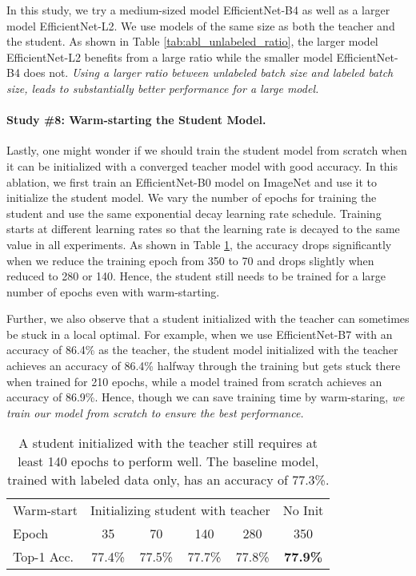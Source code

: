 \documentclass[10pt,twocolumn,letterpaper]{article}
\begin{document}
In this study, we try a medium-sized model EfficientNet-B4 as well as a larger model EfficientNet-L2. We use models of the same size as both the teacher and the student. As shown in Table \ref{tab:abl_unlabeled_ratio}, the larger model EfficientNet-L2 benefits from a large ratio while the smaller model EfficientNet-B4 does not. \emph{Using a larger ratio between unlabeled batch size and labeled batch size, leads to substantially better performance for a large model. }





\paragraph{Study \#8: Warm-starting the Student Model.}
Lastly, one might wonder if we should train the student model from scratch when it can be initialized with a converged teacher model with good accuracy. In this ablation, we first train an EfficientNet-B0 model on ImageNet and use it to initialize the student model. We vary the number of epochs for training the student and use the same exponential decay learning rate schedule. Training starts at different learning rates so that the learning rate is decayed to the same value in all experiments. As shown in Table \ref{tab:warm_start}, the accuracy drops significantly when we reduce the training epoch from 350 to 70 and drops slightly when reduced to 280 or 140. Hence, the student still needs to be trained for a large number of epochs even with warm-starting.

Further, we also observe that a student initialized with the teacher can sometimes be stuck in a local optimal. For example, when we use EfficientNet-B7 with an accuracy of 86.4\% as the teacher, the student model initialized with the teacher achieves an accuracy of 86.4\% halfway through the training but gets stuck there when trained for 210 epochs, while a model trained from scratch achieves an accuracy of 86.9\%. Hence, though we can save training time by warm-staring, \emph{we train our model from scratch to ensure the best performance.}

\begin{table}[h!]
\footnotesize
    \centering
    \begin{tabular}{l|cccc|c}
    \toprule
    Warm-start & \multicolumn{4}{c|}{Initializing student with teacher} & No Init \\
    Epoch & 35 & 70 & 140 & 280 & 350 \\
    \midrule
    Top-1 Acc. & 77.4\%  & 77.5\% & 77.7\% & 77.8\% & \bf 77.9\% \\
    \bottomrule
    \end{tabular}
    \caption{A student initialized with the teacher still requires at least 140 epochs to perform well. The baseline model, trained with labeled data only, has an accuracy of 77.3\%.}
    \label{tab:warm_start}
\end{table}
\end{document}
